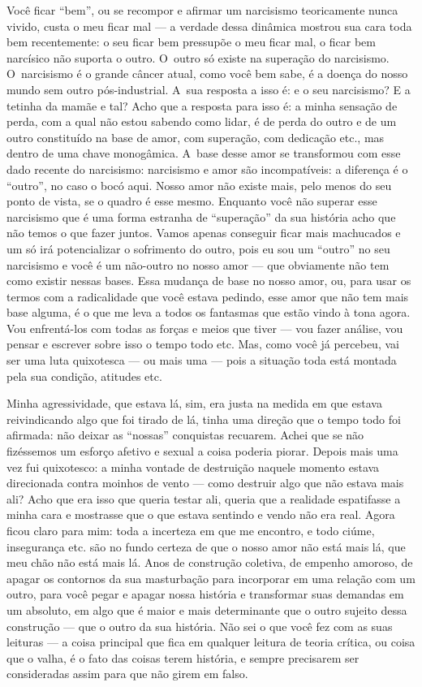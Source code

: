 Você ficar ``bem'', ou se recompor e afirmar um narcisismo teoricamente
nunca vivido, custa o meu ficar mal --- a verdade dessa dinâmica mostrou
sua cara toda bem recentemente: o seu ficar bem pressupõe o meu ficar
mal, o ficar bem narcísico não suporta o outro. O~outro só existe na
superação do narcisismo. O~narcisismo é o grande câncer atual, como você
bem sabe, é a doença do nosso mundo sem outro pós-industrial. A~sua
resposta a isso é: e o seu narcisismo? E a tetinha da mamãe e tal? Acho
que a resposta para isso é: a minha sensação de perda, com a qual não
estou sabendo como lidar, é de perda do outro e de um outro constituído
na base de amor, com superação, com dedicação etc., mas dentro de uma
chave monogâmica. A~base desse amor se transformou com esse dado recente
do narcisismo: narcisismo e amor são incompatíveis: a diferença é o
``outro'', no caso o bocó aqui. Nosso amor não existe mais, pelo menos
do seu ponto de vista, se o quadro é esse mesmo. Enquanto você não
superar esse narcisismo que é uma forma estranha de ``superação'' da sua
história acho que não temos o que fazer juntos. Vamos apenas conseguir
ficar mais machucados e um só irá potencializar o sofrimento do outro,
pois eu sou um ``outro'' no seu narcisismo e você é um não-outro no
nosso amor --- que obviamente não tem como existir nessas bases. Essa
mudança de base no nosso amor, ou, para usar os termos com a
radicalidade que você estava pedindo, esse amor que não tem mais base
alguma, é o que me leva a todos os fantasmas que estão vindo à tona
agora. Vou enfrentá-los com todas as forças e meios que tiver --- vou
fazer análise, vou pensar e escrever sobre isso o tempo todo etc. Mas,
como você já percebeu, vai ser uma luta quixotesca --- ou mais uma ---
pois a situação toda está montada pela sua condição, atitudes etc.

Minha agressividade, que estava lá, sim, era justa na medida em que
estava reivindicando algo que foi tirado de lá, tinha uma direção que o
tempo todo foi afirmada: não deixar as ``nossas'' conquistas recuarem.
Achei que se não fizéssemos um esforço afetivo e sexual a coisa poderia
piorar. Depois mais uma vez fui quixotesco: a minha vontade de
destruição naquele momento estava direcionada contra moinhos de vento
--- como destruir algo que não estava mais ali? Acho que era isso que
queria testar ali, queria que a realidade espatifasse a minha cara e
mostrasse que o que estava sentindo e vendo não era real. Agora ficou
claro para mim: toda a incerteza em que me encontro, e todo ciúme,
insegurança etc. são no fundo certeza de que o nosso amor não está mais
lá, que meu chão não está mais lá. Anos de construção coletiva, de
empenho amoroso, de apagar os contornos da sua masturbação para
incorporar em uma relação com um outro, para você pegar e apagar nossa
história e transformar suas demandas em um absoluto, em algo que é maior
e mais determinante que o outro sujeito dessa construção --- que o outro
da sua história. Não sei o que você fez com as suas leituras --- a coisa
principal que fica em qualquer leitura de teoria crítica, ou coisa que o
valha, é o fato das coisas terem história, e sempre precisarem ser
consideradas assim para que não girem em falso.

